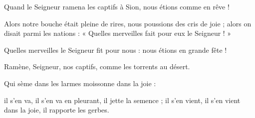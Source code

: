 \item Quand le Seigneur ramena les captifs à Sion, nous étions comme en rêve !

\item Alors notre bouche était pleine de rires, nous poussions des cris de joie ; alors on disait parmi les nations : « Quelles merveilles fait pour eux le Seigneur ! »

\item Quelles merveilles le Seigneur fit pour nous : nous étions en grande fête !

\item Ramène, Seigneur, nos captifs, comme les torrents au désert.

\item Qui sème dans les larmes moissonne dans la joie :

\item il s'en va, il s'en va en pleurant, il jette la semence ; il s'en vient, il s'en vient dans la joie, il rapporte les gerbes.
